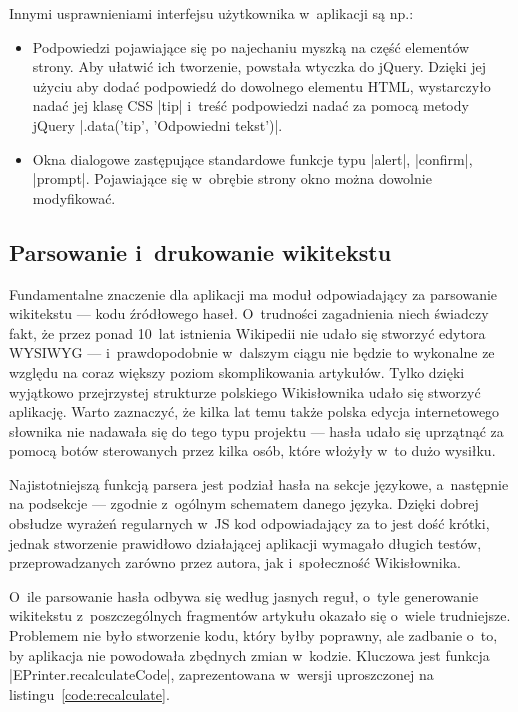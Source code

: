 Innymi usprawnieniami interfejsu użytkownika w~aplikacji są np.:
\begin{itemize}
\item Podpowiedzi pojawiające się po najechaniu myszką na część elementów strony. Aby ułatwić ich tworzenie, powstała wtyczka do jQuery. Dzięki jej użyciu aby dodać podpowiedź do dowolnego elementu HTML, wystarczyło nadać jej klasę CSS \kod|tip| i~treść podpowiedzi nadać za pomocą metody jQuery \kod|.data('tip', 'Odpowiedni tekst')|.
\item Okna dialogowe zastępujące standardowe funkcje typu \kod|alert|, \kod|confirm|, \kod|prompt|. Pojawiające się w~obrębie strony okno można dowolnie modyfikować.
\end{itemize}

\subsection{Parsowanie i~drukowanie wikitekstu}
\label{impl:parser}
Fundamentalne znaczenie dla aplikacji ma moduł odpowiadający za parsowanie wikitekstu --- kodu źródłowego haseł. O~trudności zagadnienia niech świadczy fakt, że przez ponad 10~lat istnienia Wikipedii nie udało się stworzyć edytora WYSIWYG --- i~prawdopodobnie w~dalszym ciągu nie będzie to wykonalne ze względu na coraz większy poziom skomplikowania artykułów. Tylko dzięki wyjątkowo przejrzystej strukturze polskiego Wikisłownika udało się stworzyć aplikację. Warto zaznaczyć, że kilka lat temu także polska edycja internetowego słownika nie nadawała się do tego typu projektu --- hasła udało się uprzątnąć za pomocą botów sterowanych przez kilka osób, które włożyły w~to dużo wysiłku.

Najistotniejszą funkcją parsera jest podział hasła na sekcje językowe, a~następnie na podsekcje --- zgodnie z~ogólnym schematem danego języka. Dzięki dobrej obsłudze wyrażeń regularnych w~JS kod odpowiadający za to jest dość krótki, jednak stworzenie prawidłowo działającej aplikacji wymagało długich testów, przeprowadzanych zarówno przez autora, jak i~społeczność Wikisłownika.

O~ile parsowanie hasła odbywa się według jasnych reguł, o~tyle generowanie wikitekstu z~poszczególnych fragmentów artykułu okazało się o~wiele trudniejsze. Problemem nie było stworzenie kodu, który byłby poprawny, ale zadbanie o~to, by aplikacja nie powodowała zbędnych zmian w~kodzie. Kluczowa jest funkcja \kod|EPrinter.recalculateCode|, zaprezentowana w~wersji uproszczonej na listingu~\ref{code:recalculate}.

